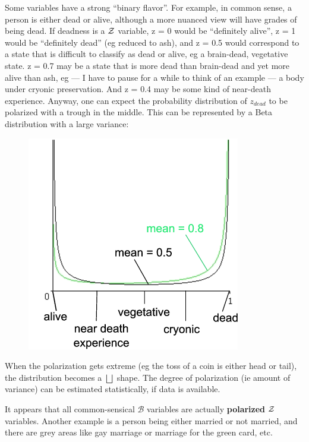 Some variables have a strong ``binary flavor''.  For example, in common sense, a person is either dead or alive, although a more nuanced view will have grades of being dead.  If deadness is a $\mathcal{Z}$ variable, z = 0 would be ``definitely alive'', z = 1 would be ``definitely dead'' (eg reduced to ash), and z = 0.5 would correspond to a state that is difficult to classify as dead or alive, eg a brain-dead, vegetative state.  z = 0.7 may be a state that is more dead than brain-dead and yet more alive than ash, eg --- I have to pause for a while to think of an example --- a body under cryonic preservation.  And z = 0.4 may be some kind of near-death experience.  Anyway, one can expect the probability distribution of $z_{dead}$ to be polarized with a trough in the middle.  This can be represented by a Beta distribution with a large variance:
\begin{figure}[H]
\centering
\includegraphics{deadness.png}
\end{figure}
When the polarization gets extreme (eg the toss of a coin is either head or tail), the distribution becomes a $\bigsqcup$ shape.  The degree of polarization (ie amount of variance) can be estimated statistically, if data is available.

It appears that all common-sensical $\mathcal{B}$ variables are actually \textbf{polarized} $\mathcal{Z}$ variables.  Another example is a person being either married or not married, and there are grey areas like gay marriage or marriage for the green card, etc.

